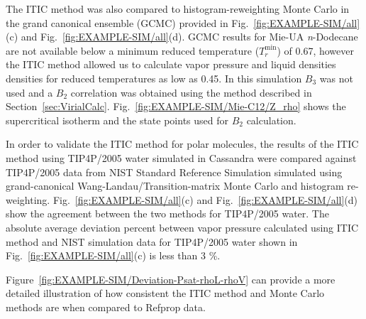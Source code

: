 \documentclass[5p,times]{elsarticle}
\begin{document}
The ITIC method was also compared to histogram-reweighting Monte Carlo in the grand canonical ensemble (GCMC) provided in Fig.~\ref{fig:EXAMPLE-SIM/all}(c) and Fig.~\ref{fig:EXAMPLE-SIM/all}(d). GCMC results for Mie-UA \textit{n}-Dodecane are not available below a minimum reduced temperature ($T_r^{\mathrm{min}}$) of 0.67, however the ITIC method allowed us to calculate vapor pressure and liquid densities densities for reduced temperatures as low as 0.45. In this simulation $B_3$ was not used and a $B_2$ correlation was obtained using the method described in Section~\ref{sec:VirialCalc}. Fig.~\ref{fig:EXAMPLE-SIM/Mie-C12/Z_rho} shows the supercritical isotherm and the state points used for $B_2$ calculation.

In order to validate the ITIC method for polar molecules, the results of the ITIC method using TIP4P/2005 water simulated in Cassandra were compared against TIP4P/2005 data from NIST Standard Reference Simulation \cite{Shen2008} simulated using grand-canonical Wang-Landau/Transition-matrix Monte Carlo and histogram re-weighting. Fig.~\ref{fig:EXAMPLE-SIM/all}(c) and Fig.~\ref{fig:EXAMPLE-SIM/all}(d) show the agreement between the two methods for TIP4P/2005 water. The absolute average deviation percent between vapor pressure calculated using ITIC method and NIST simulation data for TIP4P/2005 water shown in Fig.~\ref{fig:EXAMPLE-SIM/all}(c) is less than 3 \%.

Figure~\ref{fig:EXAMPLE-SIM/Deviation-Psat-rhoL-rhoV} can provide a more detailed illustration of how consistent the ITIC method and Monte Carlo methods are when compared to Refprop data.
\end{document}
